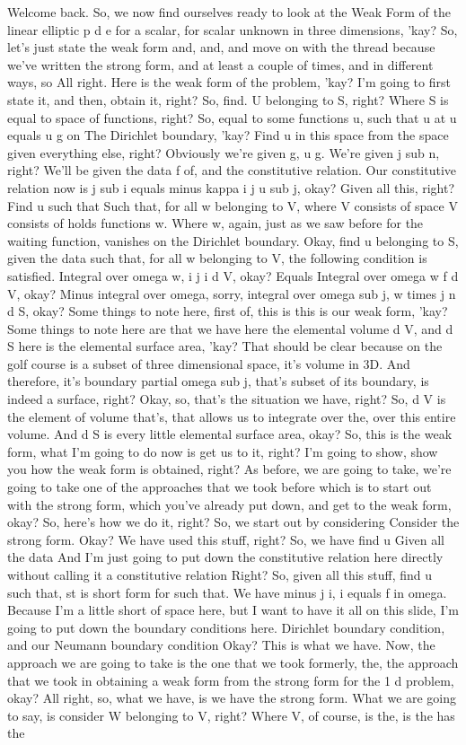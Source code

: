 \documentclass[10pt]{article}
\begin{document}
Welcome back. So, we now find ourselves ready to look at the Weak Form of the linear elliptic p d e for a scalar, for scalar unknown in three dimensions, 'kay? So, let's just state the weak form and, and, and move on with the thread because we've written the strong form, and at least a couple of times, and in different ways, so All right. Here is the weak form of the problem, 'kay? I'm going to first state it, and then, obtain it, right? So, find. U belonging to S, right? Where S is equal to space of functions, right? So, equal to some functions u, such that u at u equals u g on The Dirichlet boundary, 'kay? Find u in this space from the space given everything else, right? Obviously we're given g, u g. We're given j sub n, right? We'll be given the data f of, and the constitutive relation. Our constitutive relation now is j sub i equals minus kappa i j u sub j, okay? Given all this, right? Find u such that Such that, for all w belonging to V, where V consists of space V consists of holds functions w. Where w, again, just as we saw before for the waiting function, vanishes on the Dirichlet boundary. Okay, find u belonging to S, given the data such that, for all w belonging to V, the following condition is satisfied. Integral over omega w, i j i d V, okay? Equals Integral over omega w f d V, okay? Minus integral over omega, sorry, integral over omega sub j, w times j n d S, okay? Some things to note here, first of, this is this is our weak form, 'kay? Some things to note here are that we have here the elemental volume d V, and d S here is the elemental surface area, 'kay? That should be clear because on the golf course is a subset of three dimensional space, it's volume in 3D. And therefore, it's boundary partial omega sub j, that's subset of its boundary, is indeed a surface, right? Okay, so, that's the situation we have, right? So,  d V is the element of volume that's, that allows us to integrate over the, over this entire volume. And d S is every little elemental surface area, okay? So, this is the weak form, what I'm going to do now is get us to it, right? I'm going to show, show you how the weak form is obtained, right? As before, we are going to take, we're going to take one of the approaches that we took before which is to start out with the strong form, which you've already put down, and get to the weak form, okay? So, here's how we do it, right? So, we start out by considering Consider the strong form. Okay? We have used this stuff, right? So, we have find u Given all the data And I'm just going to put down the constitutive relation here directly without calling it a constitutive relation Right? So, given all this stuff, find u such that, st is short form for such that. We have minus j i, i equals f in omega. Because I'm a little short of space here, but I want to have it all on this slide, I'm going to put down the boundary conditions here. Dirichlet boundary condition, and our Neumann boundary condition Okay? This is what we have. Now, the approach we are going to take is the one that we took formerly, the, the approach that we took in obtaining a weak form from the strong form for the 1 d problem, okay? All right, so, what we have, is we have the strong form. What we are going to say, is consider W belonging to V, right? Where V, of course, is the, is the has the 
\end{document}
